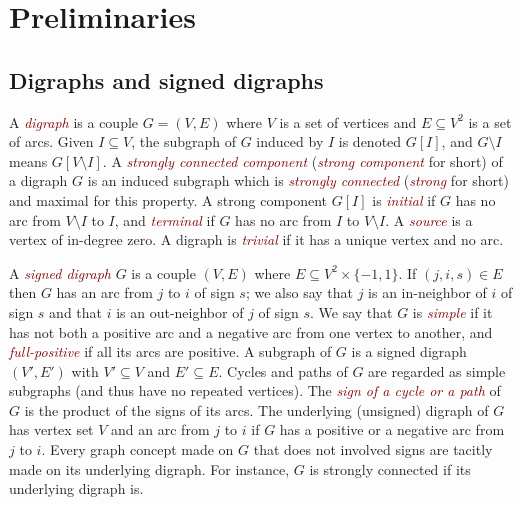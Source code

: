\documentclass[11pt,letter]{article}
\newcommand{\EM}[1]{{\em\textcolor{Maroon}{#1}}}
\begin{document}
\begin{figure}[omitted: a diagram of this paper's results, not reproduced here]\label{fig:summary}\end{figure}

\begin{figure}[omitted: a diagram of this paper's results, not reproduced here]\label{fig:dependency}\end{figure}


\section{Preliminaries}\label{sec:preliminaries}

\subsection{Digraphs and signed digraphs}

A \EM{digraph} is a couple $G=(V,E)$ where $V$ is a set of vertices and $E\subseteq V^2$ is a set of arcs. Given $I\subseteq V$, the subgraph of $G$ induced by $I$ is denoted $G[I]$, and $G\setminus I$ means $G[V\setminus I]$. A \EM{strongly connected component} (\EM{strong component} for short) of a digraph $G$ is an induced subgraph which is \EM{strongly connected} (\EM{strong} for short) and maximal for this property. A strong component $G[I]$ is \EM{initial} if $G$ has no arc from $V\setminus I$ to $I$, and \EM{terminal} if $G$ has no arc from $I$ to $V\setminus I$. A \EM{source} is a vertex of in-degree zero. A digraph is \EM{trivial} if it has a unique vertex and no arc. 

\medskip
A \EM{signed digraph} $G$ is a couple $(V,E)$ where $E\subseteq V^2\times\{-1,1\}$. If $(j,i,s)\in E$ then $G$ has an arc from $j$ to $i$ of sign $s$; we also say that $j$ is an in-neighbor of $i$ of sign $s$ and that $i$ is an out-neighbor of $j$ of sign $s$. We say that $G$ is \EM{simple} if it has not both a positive arc and a negative arc from one vertex to another, and \EM{full-positive} if all its arcs are positive. A subgraph of $G$ is a signed digraph $(V',E')$ with $V'\subseteq V$ and $E'\subseteq E$. Cycles and paths of $G$ are regarded as simple subgraphs (and thus have no repeated vertices). The \EM{sign of a cycle or a path} of $G$ is the product of the signs of its arcs. The underlying (unsigned) digraph of $G$ has vertex set $V$ and an arc from $j$ to $i$ if $G$ has a positive or a negative arc from $j$ to $i$. Every graph concept made on $G$ that does not involved signs are tacitly made on its underlying digraph. For instance, $G$ is strongly connected if its underlying digraph is.
\end{document}
